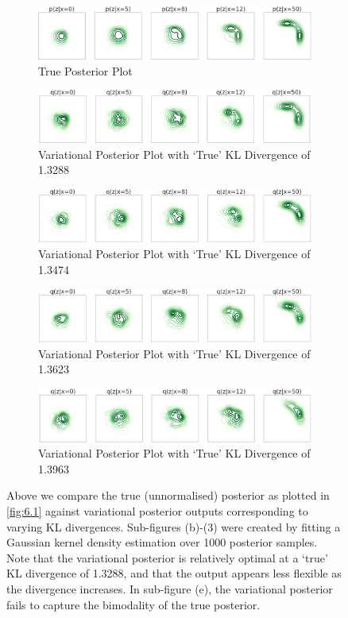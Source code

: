 \documentclass[honours,12pt]{unswthesis}
\numberwithin{equation}{section}
\theoremstyle{definition}
\begin{document}
\begin{figure}[t!]
\begin{subfigure}{\textwidth}
\includegraphics[width=\linewidth]{sprinklertrue.png}
\caption{True Posterior Plot}
\end{subfigure}
\begin{subfigure}{\textwidth}
\includegraphics[width=\linewidth]{13288.png}
\caption{Variational Posterior Plot with `True' KL Divergence of 1.3288}
\end{subfigure}
\begin{subfigure}{\textwidth}
\includegraphics[width=\linewidth]{13474.png}
\caption{Variational Posterior Plot with `True' KL Divergence of 1.3474}
\end{subfigure}
\begin{subfigure}{\textwidth}
\includegraphics[width=\linewidth]{13623.png}
\caption{Variational Posterior Plot with `True' KL Divergence of 1.3623}
\end{subfigure}
\begin{subfigure}{\textwidth}
\includegraphics[width=\linewidth]{13963.png}
\caption{Variational Posterior Plot with `True' KL Divergence of 1.3963}
\end{subfigure}
\caption{\small Above we compare the true (unnormalised) posterior as plotted in \autoref{fig:6.1} against variational posterior outputs corresponding to varying KL divergences. Sub-figures (b)-(3) were created by fitting a Gaussian kernel density estimation over 1000 posterior samples. Note that the variational posterior is relatively optimal at a `true' KL divergence of 1.3288, and that the output appears less flexible as the divergence increases. In sub-figure (e), the variational posterior fails to capture the bimodality of the true posterior.}
\label{fig:6.4}
\end{figure}
\end{document}

